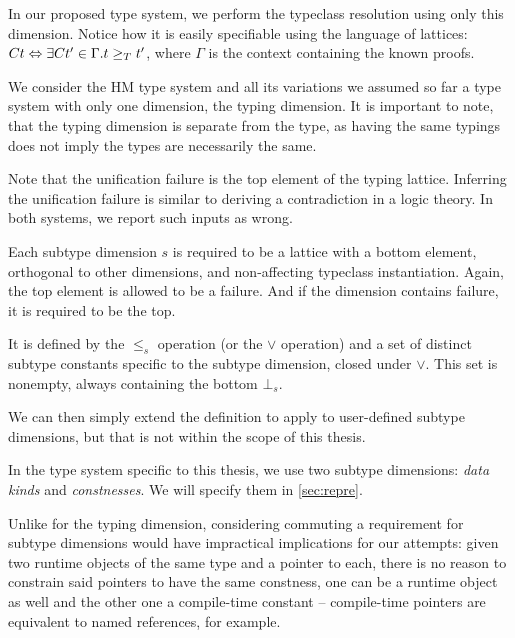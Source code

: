 In our proposed type system, we perform the typeclass resolution using only this dimension. Notice how it is easily specifiable using the language of lattices: $C t \Leftrightarrow \exists C t' \in \Gamma . t \geq_T t'$, where $\Gamma$ is the context containing the known proofs.

We consider the HM type system and all its variations we assumed so far a type system with only one dimension, the typing dimension. It is important to note, that the typing dimension is separate from the type, as having the same typings does not imply the types are necessarily the same.

Note that the unification failure is the top element of the typing lattice. Inferring the unification failure is similar to deriving a contradiction in a logic theory. In both systems, we report such inputs as wrong.

\begin{defn}
    \label{def:stDim}
    Each subtype dimension $s$ is required to be a lattice with a bottom element, orthogonal to other dimensions, and non-affecting typeclass instantiation. Again, the top element is allowed to be a failure. And if the dimension contains failure, it is required to be the top.

    It is defined by the $\leq_s$ operation (or the $\lor$ operation) and a set of distinct subtype constants specific to the subtype dimension, closed under $\lor$. This set is nonempty, always containing the bottom $\bot_s$.
\end{defn}

We can then simply extend the definition to apply to user-defined subtype dimensions, but that is not within the scope of this thesis.

In the type system specific to this thesis, we use two subtype dimensions: \emph{data kinds} and \emph{constnesses}. We will specify them in \cref{sec:repre}.

\begin{remark}
    \label{congruence}
    Unlike for the typing dimension, considering commuting a requirement for subtype dimensions would have impractical implications for our attempts: given two runtime objects of the same type and a pointer to each, there is no reason to constrain said pointers to have the same constness, one can be a runtime object as well and the other one a compile-time constant -- compile-time pointers are equivalent to named references, for example.
\end{remark}


